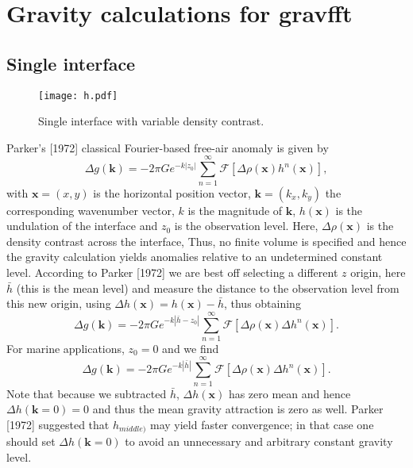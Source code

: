 \documentclass[12pt,letterpaper,margin=0.5in]{report}
\begin{document}
\section*{Gravity calculations for gravfft}
\subsection*{Single interface}
\begin{figure}[h!]
  \centering
  \texttt{[image: h.pdf]}
  \caption{Single interface with variable density contrast.}
\end{figure}

\noindent
Parker's [1972] classical Fourier-based free-air anomaly is given by
\begin{equation}
\Delta g(\mathbf{k}) = -2\pi G e^{-k|z_0|} \sum_{n=1}^\infty \mathcal{F} \left [ \Delta \rho(\mathbf{x}) h^n(\mathbf{x}) \right ],
\end{equation}
with $\mathbf{x} = (x,y)$ is the horizontal position vector, $\mathbf{k} = (k_x, k_y)$ the corresponding wavenumber
vector, $k$ is the magnitude of $\mathbf{k}$, $h(\mathbf{x})$ is the undulation of the interface and $z_0$ is the observation level.  Here,
$\Delta \rho(\mathbf{x})$ is the density contrast across the interface,  Thus, no finite volume is specified
and hence the gravity calculation yields anomalies relative to an undetermined constant level.  According to Parker [1972]
we are best off selecting a different $z$ origin, here $\bar{h}$ (this is the mean level) and measure the distance to
the observation level from this new origin, using $\Delta h(\mathbf{x}) = h(\mathbf{x}) - \bar{h}$, thus obtaining
\begin{equation}
\Delta g(\mathbf{k}) = -2\pi G e^{-k|\bar{h}-z_0|} \sum_{n=1}^\infty \mathcal{F} \left [ \Delta \rho(\mathbf{x}) \Delta h^n(\mathbf{x}) \right ].
\end{equation}
For marine applications, $z_0 = 0$ and we find
\begin{equation}
\Delta g(\mathbf{k}) = -2\pi G e^{-k|\bar{h}|} \sum_{n=1}^\infty \mathcal{F} \left [ \Delta \rho(\mathbf{x}) \Delta h^n(\mathbf{x}) \right ].
\label{eq:A}
\end{equation}
Note that because we subtracted $\bar{h}$, $\Delta h(\mathbf{x})$ has zero mean and hence $\Delta h(\mathbf{k} = 0) = 0$ and thus the
mean gravity attraction is zero as well.  Parker [1972] suggested that $h_{middle)}$ may yield faster convergence; in that
case one should set $\Delta h(\mathbf{k}=0)$ to avoid an unnecessary and arbitrary constant gravity level.
\end{document}
